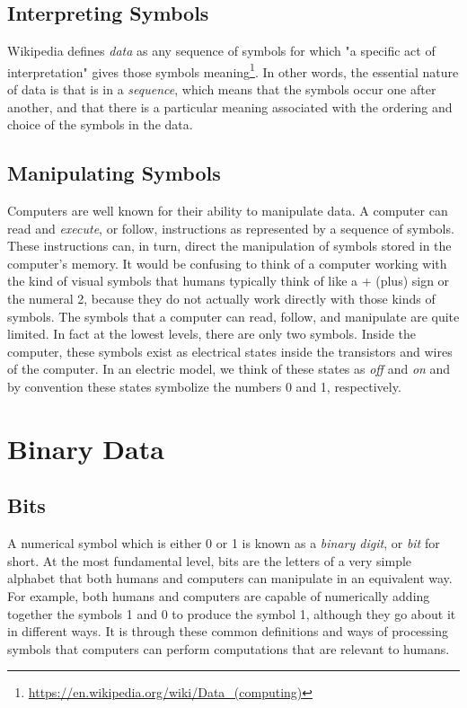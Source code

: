 \documentclass{book}
\newcommand{\newterm}[2]{\textit{#1}\index{#2}}
\begin{document}
\subsection{Interpreting Symbols}
Wikipedia defines
\newterm{data}{Data} as any sequence of symbols for which "a specific act of
interpretation" gives those symbols
meaning\footnote{\url{https://en.wikipedia.org/wiki/Data\_(computing)}}.
In other words, the essential nature of data is that is in a
\newterm{sequence}{Sequence}, which means that the symbols occur one after
another, and that there is a particular meaning associated with 
the ordering and choice of the symbols in the data.

\subsection{Manipulating Symbols}

Computers are well known for their ability to manipulate data.
A computer can read and \newterm{execute}{Execution}, or follow,
instructions as represented by a sequence of symbols.
These instructions can, in
turn, direct the manipulation of symbols stored in the computer's memory.
It would be confusing to think of a computer working with the kind of visual
symbols that humans typically think of like a + (plus) sign or the numeral 2,
because they do not actually work directly with those kinds of symbols.
The symbols that a computer can read, follow, and manipulate are quite limited.
In fact at the lowest levels, there are only two symbols. Inside the computer,
these symbols exist as electrical states inside the transistors and wires of 
the computer. In an electric model, we think of these states
as  \textit{off} and \textit{on} and by convention these states symbolize the
numbers 0 and 1, respectively.

\section{Binary Data}\label{bindata}
\subsection{Bits}
A numerical symbol which is either 0 or 1 is known as a
\newterm{binary digit}{Binary Digit}, or \newterm{bit}{Bit} for short.
At the most fundamental level, bits are the letters of a very simple
alphabet that both humans and computers can manipulate in an
equivalent way. For example, both humans and computers are capable 
of numerically adding together the symbols 1 and 0 to produce the 
symbol 1, although they go about it in different ways. It is 
through these common definitions and ways of processing
symbols that computers can perform computations
that are relevant to humans.
\end{document}
